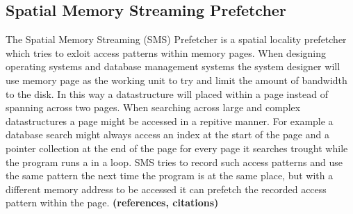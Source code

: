 \subsection{Spatial Memory Streaming Prefetcher}
\label{sec:smsPrefetcher}

The Spatial Memory Streaming (SMS) Prefetcher is a spatial locality
prefetcher which tries to exloit access patterns within memory
pages. When designing operating systems and database management
systems the system designer will use memory page as the working unit
to try and limit the amount of bandwidth to the disk. In this way a
datastructure will placed within a page instead of spanning across two
pages. When searching across large and complex datastructures a page
might be accessed in a repitive manner. For example a database search
might always access an index at the start of the page and a pointer
collection at the end of the page for every page it searches trought
while the program runs a in a loop. SMS tries to record such access
patterns and use the same pattern the next time the program is at the
same place, but with a different memory address to be accessed it can
prefetch the recorded access pattern within the page. {\bf (references,
  citations)}
